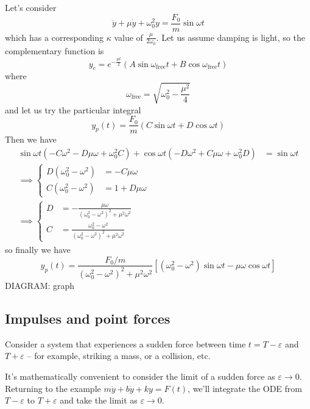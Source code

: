 \documentclass{../../template/note}
\begin{document}
    Let's consider
    \[
        \ddot y + \mu \dot y + \omega_0^2 y = \frac{F_0}{m} \sin \omega t
    \]
    which has a corresponding \(\kappa\) value of \(\frac{\mu}{2\omega_0}\). Let us assume damping is light, so the complementary function is
    \[
        y_c = e^{-\frac{\mu t}{2}}(A \sin \omega_\text{free}t + B \cos \omega_\text{free}t)
    \]
    where
    \[
        \omega_\text{free} = \sqrt{\omega_0^2 - \frac{\mu^2}{4}}
    \]
    and let us try the particular integral
    \[
        y_p(t) = \frac{F_0}{m} (C \sin \omega t + D \cos \omega t)
    \]
    Then we have
    \begin{align*}
        \sin \omega t (-C\omega^2 - D \mu \omega + \omega_0^2 C) + \cos \omega t (-D \omega^2 + C \mu \omega + \omega_0^2 D) &= \sin \omega t \\
        \implies
        \begin{cases}
            D(\omega_0^2 - \omega^2) &= -C\mu \omega \\
            C(\omega_0^2 - \omega^2) &= 1 + D \mu \omega
        \end{cases}& \\
        \implies \begin{cases}
            D &= -\frac{\mu \omega}{(\omega_0^2 - \omega^2)^2 + \mu^2 \omega^2} \\
            C &= \frac{\omega_0^2 - \omega^2}{(\omega_0^2 - \omega^2)^2 + \mu^2 \omega^2}
        \end{cases}&        
    \end{align*}
    so finally we have
    \[
        y_p(t) = \frac{F_0/m}{(\omega_0^2-\omega^2)^2 + \mu^2 \omega^2}\left[(\omega_0^2-\omega^2)\sin \omega t - \mu \omega \cos \omega t\right]
    \]
    DIAGRAM: graph


    \subsection{Impulses and point forces}

    Consider a system that experiences a sudden force between time \(t = T - \varepsilon\) and \(T + \varepsilon\) -- for example, striking a mass, or a collision, etc.

    It's mathematically convenient to consider the limit of a sudden force as \(\varepsilon \to 0\). Returning to the example \(m\ddot y + b \dot y + ky = F(t)\), we'll integrate the ODE from \(T - \varepsilon\) to \(T + \varepsilon\) and take the limit as \(\varepsilon \to 0\).
\end{document}
